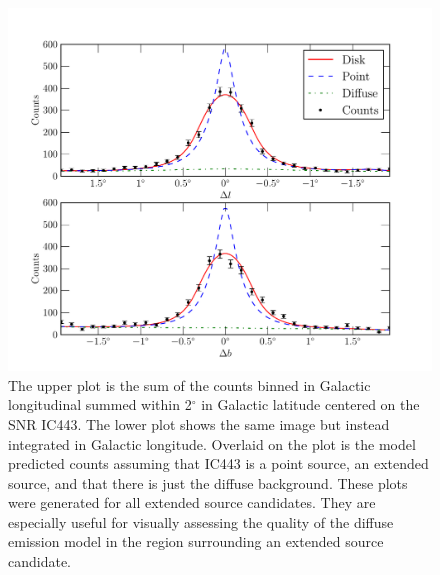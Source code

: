 \documentclass[12pt,preprint]{aastex}
\renewcommand{\deg}{\ensuremath{^\circ}\xspace}
\begin{document}
\clearpage
\begin{figure}
  \begin{center}
    \includegraphics{ic443_plots/ic443_counts_slice.pdf}
    \caption{ The upper plot is the sum of the counts binned in Galactic
    longitudinal summed within 2\deg in Galactic latitude centered on the
    SNR IC443. The lower plot shows the same image but instead integrated
    in Galactic longitude.  Overlaid on the plot is the model predicted
    counts assuming that IC443 is a point source, an extended source, and
    that there is just the diffuse background.  These plots were generated
    for all extended source candidates.  They are especially useful for
    visually assessing the quality of the diffuse emission model in the
    region surrounding an extended source candidate.} \label{counts_slice}
  \end{center}
\end{figure}
\end{document}
